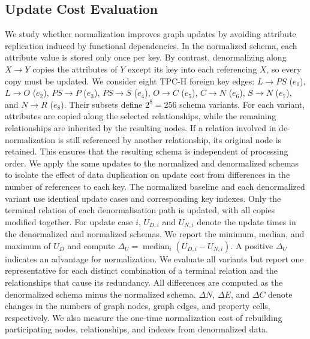 \documentclass[sigconf]{acmart}
\begin{document}
\subsection{Update Cost Evaluation}
We study whether normalization improves graph updates by avoiding attribute replication induced by functional dependencies. In the normalized schema, each attribute value is stored only once per key. By contrast, denormalizing along $X\rightarrow Y$ copies the attributes of $Y$ except its key into each referencing $X$, so every copy must be updated. We consider eight TPC-H foreign key edges: $L\rightarrow PS$ ($e_1$), $L\rightarrow O$ ($e_2$), $PS\rightarrow P$ ($e_3$), $PS\rightarrow S$ ($e_4$), $O\rightarrow C$ ($e_5$), $C\rightarrow N$ ($e_6$), $S\rightarrow N$ ($e_7$), and $N\rightarrow R$ ($e_8$). Their subsets define $2^8=256$ schema variants. For each variant, attributes are copied along the selected relationships, while the remaining relationships are inherited by the resulting nodes. If a relation involved in de-normalization is still referenced by another relationship, its original node is retained. This ensures that the resulting schema is independent of processing order. We apply the same updates to the normalized and denormalized schemas to isolate the effect of data duplication on update cost from differences in the number of references to each key. The normalized baseline and each denormalized variant use identical update cases and corresponding key indexes. Only the terminal relation of each denormalisation path is updated, with all copies modified together. For update case $i$, $U_{D,i}$ and $U_{N,i}$ denote the update times in the denormalized and normalized schemas. We report the minimum, median, and maximum of $U_D$ and compute $\Delta_U=\operatorname{median}_i(U_{D,i}-U_{N,i})$. A positive $\Delta_U$ indicates an advantage for normalization. We evaluate all variants but report one representative for each distinct combination of a terminal relation and the relationships that cause its redundancy. All differences are computed as the denormalized schema minus the normalized schema. $\Delta N$, $\Delta E$, and $\Delta C$ denote changes in the numbers of graph nodes, graph edges, and property cells, respectively. We also measure the one-time normalization cost of rebuilding participating nodes, relationships, and indexes from denormalized data.
\end{document}
